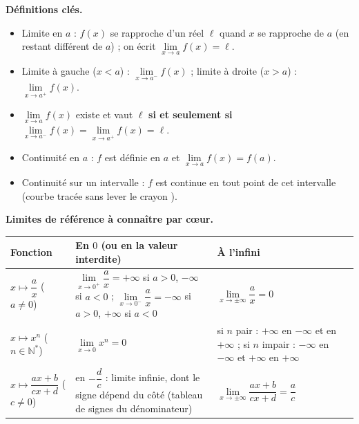 \documentclass[11pt]{article}
\newcommand{\cle}[1]{{\popxbold\color{popdark}#1}}
\begin{document}
\begin{aretenir}[L'essentiel de la le\c{c}on]
\textbf{D\'efinitions cl\'es.}
\begin{itemize}
  \item \cle{Limite en $a$} : $f(x)$ se rapproche d'un r\'eel $\ell$ quand $x$ se rapproche de $a$ (en restant diff\'erent de $a$) ; on \'ecrit $\lim\limits_{x\to a}f(x)=\ell$.
  \item \cle{Limite \`a gauche} ($x<a$) : $\lim\limits_{x\to a^-}f(x)$ ; \cle{limite \`a droite} ($x>a$) : $\lim\limits_{x\to a^+}f(x)$.
  \item $\lim\limits_{x\to a}f(x)$ existe et vaut $\ell$ \textbf{si et seulement si} $\lim\limits_{x\to a^-}f(x)=\lim\limits_{x\to a^+}f(x)=\ell$.
  \item \cle{Continuit\'e en $a$} : $f$ est d\'efinie en $a$ et $\lim\limits_{x\to a}f(x)=f(a)$.
  \item \cle{Continuit\'e sur un intervalle} : $f$ est continue en tout point de cet intervalle (courbe trac\'ee \og sans lever le crayon \fg).
\end{itemize}

\textbf{Limites de r\'ef\'erence \`a conna\^itre par c\oe ur.}
\begin{center}
\begin{tabularx}{\linewidth}{|l|X|X|}
\hline
\rowcolor{popblueL} \textbf{Fonction} & \textbf{En $0$ (ou en la valeur interdite)} & \textbf{\`A l'infini} \\
\hline
$x\mapsto \dfrac{a}{x}$ ($a\neq 0$) & $\lim\limits_{x\to 0^+}\dfrac{a}{x}=+\infty$ si $a>0$, $-\infty$ si $a<0$ ; $\lim\limits_{x\to 0^-}\dfrac{a}{x}=-\infty$ si $a>0$, $+\infty$ si $a<0$ & $\lim\limits_{x\to\pm\infty}\dfrac{a}{x}=0$ \\
\hline
$x\mapsto x^n$ ($n\in\mathbb{N}^*$) & $\lim\limits_{x\to 0}x^n=0$ & si $n$ pair : $+\infty$ en $-\infty$ et en $+\infty$ ; si $n$ impair : $-\infty$ en $-\infty$ et $+\infty$ en $+\infty$ \\
\hline
$x\mapsto \dfrac{ax+b}{cx+d}$ ($c\neq 0$) & en $-\dfrac{d}{c}$ : limite infinie, dont le signe d\'epend du c\^ot\'e (tableau de signes du d\'enominateur) & $\lim\limits_{x\to\pm\infty}\dfrac{ax+b}{cx+d}=\dfrac{a}{c}$ \\
\hline
\end{tabularx}
\end{center}


\end{aretenir}
\end{document}
